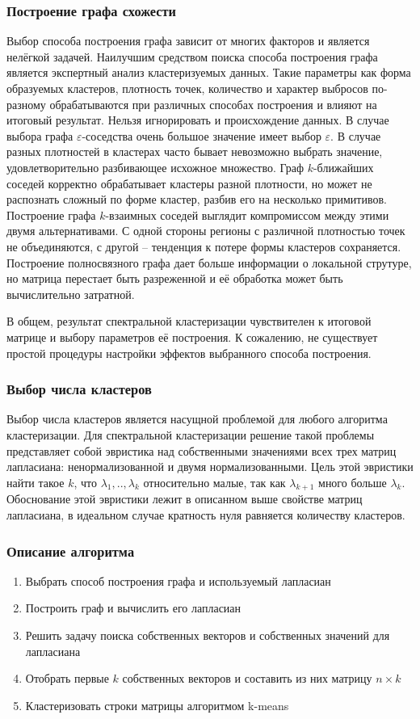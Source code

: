 \subsubsection{Построение графа схожести}
Выбор способа построения графа зависит от многих факторов и является нелёгкой задачей. Наилучшим средством поиска способа построения графа является экспертный анализ кластеризуемых данных. Такие параметры как форма образуемых кластеров, плотность точек, количество и характер выбросов по-разному обрабатываются при различных способах построения и влияют на итоговый результат. Нельзя игнорировать и происхождение данных. В случае выбора графа $\varepsilon$-соседства очень большое значение имеет выбор $\varepsilon$. В случае разных плотностей в кластерах часто бывает невозможно выбрать значение, удовлетворительно разбивающее исхожное множество. Граф $k$-ближайших соседей корректно обрабатывает кластеры разной плотности, но может не распознать сложный по форме кластер, разбив его на несколько примитивов. Построение графа $k$-взаимных соседей выглядит компромиссом между этими двумя альтернативами. С одной стороны регионы с различной плотностью точек не объединяются, с другой -- тенденция к потере формы кластеров сохраняется. Построение полносвязного графа дает больше информации о локальной струтуре, но матрица перестает быть разреженной и её обработка может быть вычислительно затратной. 

В общем, результат спектральной кластеризации чувствителен к итоговой матрице и выбору параметров её построения. К сожалению, не существует простой процедуры настройки эффектов выбранного способа построения.

\subsubsection{Выбор числа кластеров}
Выбор числа кластеров является насущной проблемой для любого алгоритма кластеризации. Для спектральной кластеризации решение такой проблемы представляет собой эвристика над собственными значениями всех трех матриц лапласиана: ненормализованной и двумя нормализованными. Цель этой эвристики найти такое $k$, что $\lambda_1,..,\lambda_k$ относительно малые, так как $\lambda_{k+1}$ много больше $\lambda_k$. Обоснование этой эвристики лежит в описанном выше свойстве матриц лапласиана, в идеальном случае кратность нуля равняется количеству кластеров. 

\subsubsection{Описание алгоритма}
\begin{enumerate}
	\item Выбрать способ построения графа и используемый лапласиан
	\item Построить граф и вычислить его лапласиан
	\item Решить задачу поиска собственных векторов и собственных значений для лапласиана
	\item Отобрать первые $k$ собственных векторов и составить из них матрицу $n \times k$
	\item Кластеризовать строки матрицы алгоритмом k-means
\end{enumerate}